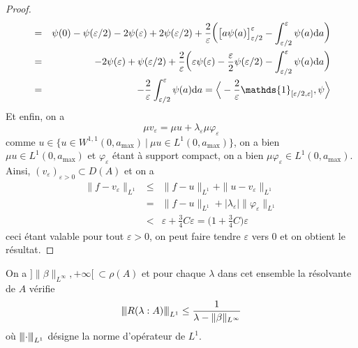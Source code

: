 \begin{proof}
\begin{eqnarray*}
        &=& \psi(0)-\psi(\varepsilon/2)-2\psi(\varepsilon)+2\psi(\varepsilon/2) + \frac{2}{\varepsilon}\bigg(\big[a\psi(a)\big]_{\varepsilon/2}^{\varepsilon}-\int_{\varepsilon/2}^{\varepsilon}\psi(a)\d a \bigg) \\
        &=& - 2 \psi(\varepsilon)+\psi(\varepsilon/2)+\frac{2}{\varepsilon}\bigg(\varepsilon \psi(\varepsilon)-\frac{\varepsilon}{2}\psi(\varepsilon/2) - \int_{\varepsilon/2}^{\varepsilon}\psi(a)\d a\bigg) \\
        &=& -\frac{2}{\varepsilon}\int_{\varepsilon/2}^{\varepsilon}\psi(a)\d a = \Big\langle - \frac{2}{\varepsilon} \mathds{1}_{[\varepsilon/2,\varepsilon]}, \psi \Big\rangle
    \end{eqnarray*}
    Et enfin, on a 
    \begin{equation*}
        \mu v_{\varepsilon} = \mu u + \lambda_{\varepsilon}\mu \varphi_{\varepsilon}
    \end{equation*}
    comme $u \in \big\{ u \in W^{1,1}(0,a_{\max}) \ | \ \mu u \in L^1(0,a_{\max})\big\}$, on a bien $\mu u \in L^1(0,a_{\max})$ et $\varphi_{\varepsilon}$ étant à support compact, on a bien $\mu \varphi_{\varepsilon} \in L^1(0,a_{\max})$. Ainsi, $(v_{\varepsilon})_{\varepsilon >0} \subset D(A)$ et on a 
    \begin{eqnarray*}
        \|f-v_{\varepsilon}\|_{L^1} &\leq& \|f-u\|_{L^1} + \|u-v_{\varepsilon}\|_{L^1} \\
        &=& \|f-u\|_{L^1} + |\lambda_{\varepsilon}|\|\varphi_{\varepsilon}\|_{L^1} \\
        &<& \varepsilon + \frac{3}{4}C \varepsilon = \Big(1+\frac{3}{4}C\Big)\varepsilon
    \end{eqnarray*}
    ceci étant valable pour tout $\varepsilon >0$, on peut faire tendre $\varepsilon$ vers $0$ et on obtient le résultat.
\end{proof}

\begin{proposition}
    On a $]\|\beta\|_{L^{\infty}},+\infty[ \ \subset \rho(A)$ et pour chaque $\lambda$ dans cet ensemble la résolvante de $A$ vérifie
    \begin{equation*}
        {\left\vert\kern-0.25ex\left\vert \kern-0.25ex\left\vert R(\lambda : A) \right\vert\kern-0.25ex\right\vert\kern-0.25ex\right\vert}_{L^1} \leq \frac{1}{\lambda - \|\beta\|_{L^\infty}}
    \end{equation*}
    où ${\left\vert\kern-0.25ex\left\vert \kern-0.25ex\left\vert \cdot \right\vert\kern-0.25ex\right\vert\kern-0.25ex\right\vert}_{L^1}$ désigne la norme d'opérateur de $L^1$.
\end{proposition}

